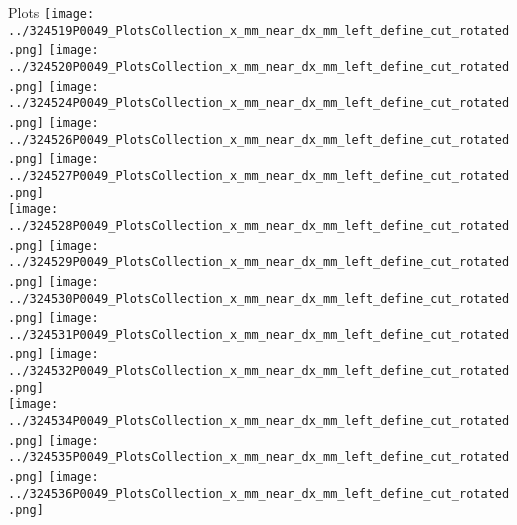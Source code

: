 \documentclass{beamer}
\begin{document}
\begin{frame}
\begin{block}{Plots}
                \texttt{[image: ../324519P0049\_PlotsCollection\_x\_mm\_near\_dx\_mm\_left\_define\_cut\_rotated.png]}
                \texttt{[image: ../324520P0049\_PlotsCollection\_x\_mm\_near\_dx\_mm\_left\_define\_cut\_rotated.png]}
                \texttt{[image: ../324524P0049\_PlotsCollection\_x\_mm\_near\_dx\_mm\_left\_define\_cut\_rotated.png]}
                \texttt{[image: ../324526P0049\_PlotsCollection\_x\_mm\_near\_dx\_mm\_left\_define\_cut\_rotated.png]}
                \texttt{[image: ../324527P0049\_PlotsCollection\_x\_mm\_near\_dx\_mm\_left\_define\_cut\_rotated.png]}\\
                \texttt{[image: ../324528P0049\_PlotsCollection\_x\_mm\_near\_dx\_mm\_left\_define\_cut\_rotated.png]}
                \texttt{[image: ../324529P0049\_PlotsCollection\_x\_mm\_near\_dx\_mm\_left\_define\_cut\_rotated.png]}
                \texttt{[image: ../324530P0049\_PlotsCollection\_x\_mm\_near\_dx\_mm\_left\_define\_cut\_rotated.png]}
                \texttt{[image: ../324531P0049\_PlotsCollection\_x\_mm\_near\_dx\_mm\_left\_define\_cut\_rotated.png]}
                \texttt{[image: ../324532P0049\_PlotsCollection\_x\_mm\_near\_dx\_mm\_left\_define\_cut\_rotated.png]}\\
                \texttt{[image: ../324534P0049\_PlotsCollection\_x\_mm\_near\_dx\_mm\_left\_define\_cut\_rotated.png]}
                \texttt{[image: ../324535P0049\_PlotsCollection\_x\_mm\_near\_dx\_mm\_left\_define\_cut\_rotated.png]}
                \texttt{[image: ../324536P0049\_PlotsCollection\_x\_mm\_near\_dx\_mm\_left\_define\_cut\_rotated.png]}

        \end{block}
\end{frame}
\end{document}
